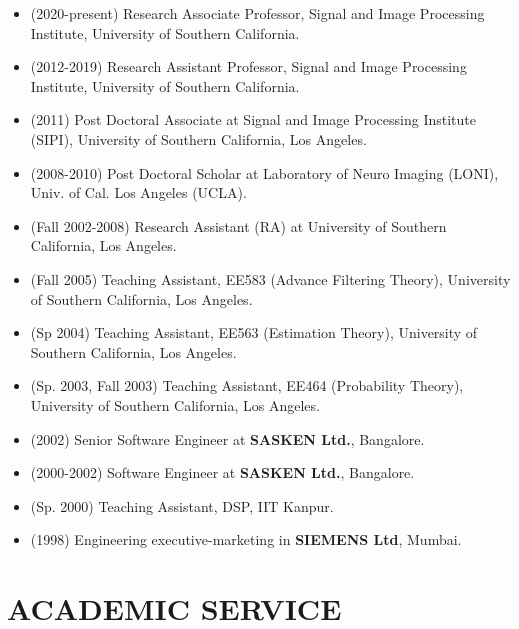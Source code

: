 \documentclass[overlapped,line,letterpaper]{res}
\begin{document}
\begin{resume}
\begin{itemize}
\item (2020-present) Research Associate Professor, Signal and Image Processing 
Institute, University of Southern California. 
\item (2012-2019) Research Assistant Professor, Signal and Image Processing Institute, University of Southern California. 
\item (2011) Post Doctoral Associate at Signal and Image Processing Institute (SIPI), University of Southern California, Los Angeles.
\item (2008-2010) Post Doctoral Scholar at Laboratory of Neuro Imaging (LONI), Univ. of Cal. Los Angeles (UCLA).
\item (Fall 2002-2008) Research Assistant (RA) at University of Southern California, Los Angeles.
\item (Fall 2005) Teaching Assistant, EE583 (Advance Filtering Theory), University of Southern California, Los Angeles.
\item (Sp 2004) Teaching Assistant, EE563 (Estimation Theory), University of Southern California, Los Angeles.
\item (Sp. 2003, Fall 2003) Teaching Assistant, EE464 (Probability Theory), University of Southern California, Los Angeles.
\item (2002) Senior Software Engineer at \textbf{SASKEN Ltd.}, Bangalore.
\item (2000-2002) Software Engineer at \textbf{SASKEN Ltd.}, Bangalore.
\item (Sp. 2000) Teaching Assistant, DSP, IIT Kanpur.
\item (1998) Engineering executive-marketing in \textbf{SIEMENS Ltd}, Mumbai.
\end{itemize}
\section{\bf ACADEMIC SERVICE}

\end{resume}
\end{document}
